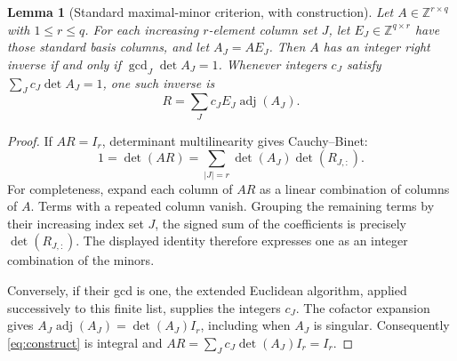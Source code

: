 \documentclass[11pt]{article}
\newtheorem{lemma}[theorem]{Lemma}
\DeclareMathOperator{\adj}{adj}
\newcommand{\Z}{\mathbb Z}
\begin{document}
\begin{lemma}[Standard maximal-minor criterion, with construction]
\label{lem:minors}
Let $A\in\Z^{r\times q}$ with $1\le r\le q$. For each increasing
$r$-element column set $J$, let $E_J\in\Z^{q\times r}$ have those
standard basis columns, and let $A_J=AE_J$. Then $A$ has an integer
right inverse if and only if $\gcd_J\det A_J=1$. Whenever integers
$c_J$ satisfy $\sum_J c_J\det A_J=1$, one such inverse is
\begin{equation}\label{eq:construct}
 R=\sum_J c_J E_J\adj(A_J).
\end{equation}
\end{lemma}
\begin{proof}
If $AR=I_r$, determinant multilinearity gives Cauchy--Binet:
\[
 1=\det(AR)=\sum_{|J|=r}\det(A_J)\det(R_{J,:}).
\]
For completeness, expand each column of $AR$ as a linear combination
of columns of $A$. Terms with a repeated column vanish. Grouping the
remaining terms by their increasing index set $J$, the signed sum of
the coefficients is precisely $\det(R_{J,:})$. The displayed identity
therefore expresses one as an integer combination of the minors.

Conversely, if their gcd is one, the extended Euclidean algorithm,
applied successively to this finite list, supplies the integers $c_J$.
The cofactor expansion gives $A_J\adj(A_J)=\det(A_J)I_r$, including
when $A_J$ is singular. Consequently \eqref{eq:construct} is integral
and $AR=\sum_J c_J\det(A_J)I_r=I_r$.
\end{proof}
\end{document}
